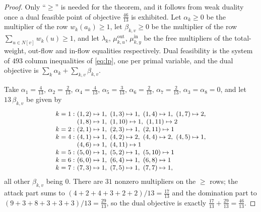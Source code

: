 \documentclass[11pt]{amsart}
\theoremstyle{remark}
\begin{document}
\begin{proof}
Only ``$\ge$'' is needed for the theorem, and it follows from weak duality once
a dual feasible point of objective $\tfrac{46}{13}$ is exhibited. Let
$\alpha_k\ge0$ be the multiplier of the row $w_k(a_k)\ge1$, let
$\beta_{k,v}\ge0$ be the multiplier of the row
$\sum_{u\in N[v]}w_k(u)\ge1$, and let $\lambda_k$, $\mu^{\mathrm{out}}_{k,u}$,
$\mu^{\mathrm{in}}_{k,y}$ be the free multipliers of the total-weight,
out-flow and in-flow equalities respectively. Dual feasibility is the system of
$493$ column inequalities of \eqref{eq:lp}, one per primal variable, and the
dual objective is $\sum_k\alpha_k+\sum_{k,v}\beta_{k,v}$.

Take $\alpha_1=\tfrac4{13}$, $\alpha_2=\tfrac2{13}$, $\alpha_4=\tfrac4{13}$,
$\alpha_5=\tfrac3{13}$, $\alpha_6=\tfrac2{13}$, $\alpha_7=\tfrac2{13}$,
$\alpha_3=\alpha_8=0$, and let $13\,\beta_{k,v}$ be given by
\[
\small
\begin{array}{l@{\ }l}
 k=1: & (1,2)\mapsto1,\ (1,3)\mapsto1,\ (1,4)\mapsto1,\ (1,7)\mapsto2,\\
      & (1,8)\mapsto1,\ (1,10)\mapsto1,\ (1,11)\mapsto2\\
 k=2: & (2,1)\mapsto1,\ (2,3)\mapsto1,\ (2,11)\mapsto1\\
 k=4: & (4,1)\mapsto1,\ (4,2)\mapsto2,\ (4,4)\mapsto2,\ (4,5)\mapsto1,\\
      & (4,6)\mapsto1,\ (4,11)\mapsto1\\
 k=5: & (5,0)\mapsto1,\ (5,2)\mapsto1,\ (5,10)\mapsto1\\
 k=6: & (6,0)\mapsto1,\ (6,4)\mapsto1,\ (6,8)\mapsto1\\
 k=7: & (7,3)\mapsto1,\ (7,5)\mapsto1,\ (7,7)\mapsto1,
\end{array}
\]
all other $\beta_{k,v}$ being $0$. There are $31$ nonzero multipliers on the
$\ge$ rows; the attack part sums to
$(4+2+4+3+2+2)/13=\tfrac{17}{13}$ and the domination part to
$(9+3+8+3+3+3)/13=\tfrac{29}{13}$, so the dual objective is exactly
$\tfrac{17}{13}+\tfrac{29}{13}=\tfrac{46}{13}$.


\end{proof}
\end{document}
